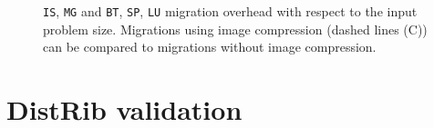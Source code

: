 \begin{figure}[t]
\hspace{10pt}
\caption[Migration overhead evaluation]{\texttt{IS}, \texttt{MG} and \texttt{BT}, \texttt{SP}, \texttt{LU}
    migration overhead with respect to the input problem size. Migrations using image
    compression (dashed lines (C)) can be compared to migrations without image
    compression.}
  \label{fig:cap6-migrationtime}%
\end{figure}

\clearpage

\section{DistRib validation}
\label{sec:distribval}

